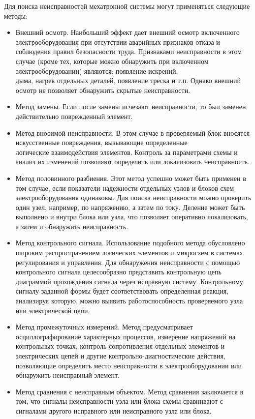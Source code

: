 Для поиска неисправностей мехатронной системы могут применяться следующие методы:
\begin{itemize}
    \item Внешний осмотр. Наибольший эффект дает внешний осмотр включенного электрооборудования при отсутствии аварийных признаков отказа и соблюдения правил безопасности труда. Признаками неисправности в этом случае (кроме тех, которые можно обнаружить при включенном электрооборудовании) являются: появление искрений,\\дыма, нагрев отдельных деталей, появление треска и т.п. Однако внешний осмотр не позволяет обнаружить скрытые неисправности.
    \item Метод замены. Если после замены исчезают неисправности, то был заменен действительно поврежденный элемент.
    \item Метод вносимой неисправности. В этом случае в проверяемый блок вносятся искусственные повреждения, вызывающие определенные\\логические взаимодействия элементов. Контроль за параметрами схемы и анализ их изменений позволяют определить или локализовать неисправность.
    \item Метод половинного разбиения. Этот метод успешно может быть применен в том случае, если показатели надежности отдельных узлов и блоков схем электрооборудования одинаковы. Для поиска неисправности можно проверить один узел, например, по напряжению, а затем по току. Деление может быть выполнено и внутри блока или узла, что позволяет оперативно локализовать, а затем и обнаружить неисправность.
    \item Метод контрольного сигнала. Использование подобного метода обусловлено широким распространением логических элементов и микросхем в системах регулирования и управления. Для обнаружения неисправности с помощью контрольного сигнала целесообразно представить контрольную цепь диаграммой прохождения сигнала через исправную систему. Контрольному сигналу заданной формы будет соответствовать определенная реакция, анализируя которую, можно выявить работоспособность проверяемого узла или электрической цепи.
    \item Метод промежуточных измерений. Метод предусматривает осциллографирование характерных процессов, измерение напряжений на контрольных точках, контроль сопротивления отдельных элементов и электрических цепей и другие контрольно-диагностические действия, позволяющие определить место неисправности в электрооборудовании или обнаружить неисправный элемент.
    \item Метод сравнения с неисправным объектом. Метод сравнения заключается в том, что сигналы неисправности узла или блока схемы сравнивают с сигналами другого исправного или неисправного узла или блока.
\end{itemize}

